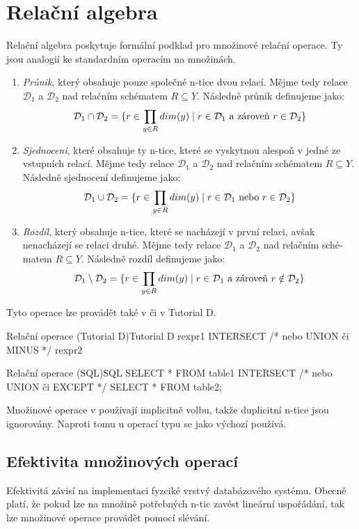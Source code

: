 \section{Relační algebra}
Relační algebra poskytuje formální podklad pro množinové relační operace. Ty jsou analogií ke standardním operacím na množinách.
\begin{enumerate}
\item \textit{Průnik}, který obsahuje pouze společné n-tice dvou relací. Mějme tedy relace $\mathcal{D}_{1}$ a $\mathcal{D}_{2}$ nad relačním schématem $R \subseteq Y$. Následně průnik definujeme jako:
$$
\mathcal{D}_{1} \cap \mathcal{D}_{2} = \lbrace r \in \prod_{y \in R} dim(y) \thickspace | \thickspace r \in \mathcal{D}_{1} \text{ a zároveň } r \in \mathcal{D}_{2} \rbrace
$$
\item \textit{Sjednoceni}, které obsahuje ty n-tice, které se vyskytnou alespoň v jedné ze vstupních relací. Mějme tedy relace $\mathcal{D}_{1}$ a $\mathcal{D}_{2}$ nad relačním schématem $R \subseteq Y$. Následně sjednocení definujeme jako:
$$
\mathcal{D}_{1} \cup \mathcal{D}_{2} = \lbrace r \in \prod_{y \in R} dim(y) \thickspace | \thickspace r \in \mathcal{D}_{1} \text{ nebo } r \in \mathcal{D}_{2} \rbrace
$$
\item \textit{Rozdíl}, který obsahuje n-tice, které se nacházejí v první relaci, avšak nenacházejí se relaci druhé. Mějme tedy relace $\mathcal{D}_{1}$ a $\mathcal{D}_{2}$ nad relačním sché-matem $R \subseteq Y$. Následně rozdíl definujeme jako:
$$
\mathcal{D}_{1} \setminus \mathcal{D}_{2} = \lbrace r \in \prod_{y \in R} dim(y) \thickspace | \thickspace r \in \mathcal{D}_{1} \text{ a zároveň } r \notin \mathcal{D}_{2} \rbrace
$$
\end{enumerate}
Tyto operace lze provádět také v  či v Tutorial D.
\begin{upcode}{Relační operace (Tutorial D)}{}{Tutorial D}
rexpr1 INTERSECT /* nebo UNION či MINUS */ rexpr2
\end{upcode}
\begin{upcode}{Relační operace (SQL)}{}{SQL}
SELECT * FROM table1
	INTERSECT /* nebo UNION či EXCEPT */
SELECT * FROM table2;
\end{upcode}
Množinové operace v  používají implicitně volbu, takže duplicitní n-tice jsou ignorovány. Naproti tomu u operací typu se jako výchozí používá.

\subsection{Efektivita množinových operací}
Efektivitá závisí na implementaci fyzciké vrstvý databázového systému. Obecně platí, že pokud lze na množině potřebných n-tic zavést lineární uspořádání, tak lze množinové operace provádět pomocí slévání.

